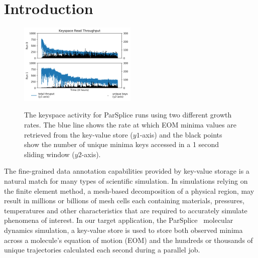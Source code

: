 \section{Introduction}


\begin{figure}[t]
  \noindent\includegraphics[width=0.5\textwidth]{figures/motivation-regimes.png}\\
  \caption{The keyspace activity for ParSplice runs using two different growth 
  rates.  The blue line shows the rate at which EOM minima values are retrieved
  from the key-value store (\(y1\)-axis) and the black points show the number of
  unique minima keys accessed in a 1 second sliding window (\(y2\)-axis).
  \label{fig:motivation-regimes}}
\end{figure}

The fine-grained data annotation capabilities provided by key-value storage is
a natural match for many types of scientific simulation. In simulations relying
on the finite element method, a mesh-based decomposition of a physical region,
may result in millions or billions of mesh cells each containing materials,
pressures, temperatures and other characteristics that are required to
accurately simulate phenomena of interest. In our target application, the
ParSplice~\cite{perez:jctc20150parsplice} molecular dynamics simulation, a
key-value store is used to store both observed minima across a molecule's
equation of motion (EOM) and the hundreds or thousands of unique trajectories
calculated each second during a parallel job. 

